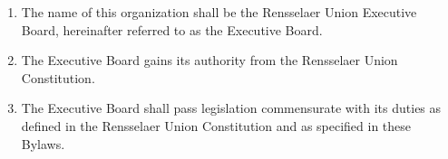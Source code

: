 
\begin{enumerate}
\item The name of this organization shall be the Rensselaer Union Executive Board, hereinafter referred to as the Executive Board.
\item The Executive Board gains its authority from the Rensselaer Union Constitution. 
\item The Executive Board shall pass legislation commensurate with its duties as defined in the Rensselaer Union Constitution and as specified in these Bylaws.
\end{enumerate}